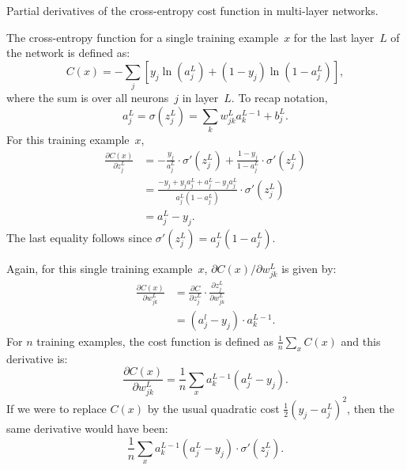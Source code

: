 \begin{exercise}
Partial derivatives of the cross-entropy cost function in multi-layer
networks.
\end{exercise}
\begin{solution}
The cross-entropy function for a single training example~$x$ for the last
layer~$L$ of the network is defined as:
\[
    C(x) = - \sum_j \left [ y_j \ln (a_j^L) + (1 - y_j) \ln(1 - a_j^L) \right ],
\]
where the sum is over all neurons~$j$ in layer~$L$. To recap notation,  
\[
a_j^L = \sigma(z_j^L) = \sum_k w_{j k}^L a_k^{L - 1} + b_j^L.
\]
For this training example~$x$,
\begin{align*}
    \frac{\partial C(x)}{\partial z_j^L} 
        & = - \frac{y_j}{a_j^L} \cdot \sigma' (z_j^L) + \frac{1 - y_j}{1 - a_j^L} \cdot \sigma' (z_j^L) \\
        & = \frac{-y_j + y_j a_j^L + a_j^L - y_j a_j^L}{a_j^L (1 - a_j^L)} \cdot \sigma' (z_j^L) \\
        & = a_j^L - y_j.
\end{align*}
The last equality follows since $\sigma' (z_j^L) = a_j^L (1 - a_j^L)$.

Again, for this single training example~$x$, $\partial C (x) / \partial w_{j k}^L$ 
is given by:
\begin{align*}
    \frac{\partial C (x)}{\partial w_{j k}^L} 
        & = \frac{\partial C}{\partial z_j^L} \cdot \frac{\partial z_j^L}{\partial w_{j k}^L} \\
        & = (a_j^l - y_j) \cdot a_k^{L - 1}. 
\end{align*}
For $n$ training examples, the cost function is defined as $\frac{1}{n} \sum_{x} C(x)$ and 
this derivative is: 
\[
    \frac{\partial C (x)}{\partial w_{j k}^L} = \frac{1}{n} \sum_x a_k^{L - 1} (a_j^L - y_j).
\]
If we were to replace $C(x)$ by the usual quadratic cost $\frac{1}{2}(y_j - a_j^L)^2$, then 
the same derivative would have been:
\[
    \frac{1}{n} \sum_x a_k^{L - 1} (a_j^L - y_j) \cdot \sigma' (z_j^L).
\]
\end{solution}
